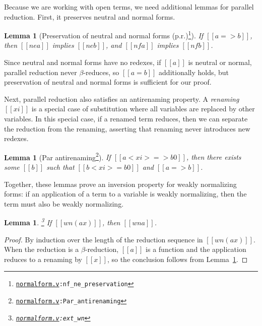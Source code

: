 \documentclass[\ifpublic nolinenum\else\fi,online,OA]{jfp}
\newcommand{\scw}[1]{}
\newcommand{\yl}[1]{}
\newcommand{\dotv}[2]{\href{#1}{\texttt{#1}}{\texttt{:#2}}}
\newtheorem{lemma}[theorem]{Lemma}
\theoremstyle{definition}
\begin{document}
Because we are working with open terms, we need additional lemmas for parallel
reduction. First, it preserves neutral and normal forms.

\begin{lemma}[Preservation of neutral and normal forms (p.r.)\footnote{\dotv{normalform.v}{nf\_ne\_preservation}}]
  \label{lemma:parnenf}
  If $[[a => b]]$, then $[[ne a]]$ implies $[[ne b]]$,
  and $[[nf a]]$ implies $[[nf b]]$.
\end{lemma}

Since neutral and normal forms have no redexes, if $[[a]]$ is neutral or normal,
parallel reduction never $\beta$-reduces, so $[[a = b]]$ additionally holds,
but preservation of neutral and normal forms is sufficient for our proof.

Next, parallel reduction also satisfies an antirenaming property. A
\emph{renaming} $[[xi]]$ is a special case of substitution where all variables
are replaced by other variables. In this special case, if a renamed term
reduces, then we can separate the reduction from the renaming, asserting that
renaming never introduces new redexes.

\begin{lemma}[Par antirenaming\footnote{\dotv{normalform.v}{Par\_antirenaming}}]
  \label{lemma:parantirenaming}
  If $[[a < xi > => b0]]$, then there exists some $[[b]]$ such that
  $[[b < xi > = b0]]$ and $[[a => b]]$.
\end{lemma}

\scw{This lemma is only used to prove \texttt{wn\_antirenaming}, which is then
used more generally. Maybe we should replace it with  that?}
\yl{Anti-renaming is mentioned once in Section 6 when we talk about how confluence with $\eta$
depends on anti-renaming for Par. I don't think that discussion in
Section 6 is very important so I'm fine with replacing it}

Together, these lemmas prove an inversion property for weakly normalizing forms:
if an application of a term to a variable is weakly normalizing, then the term
must also be weakly normalizing.

\begin{lemma}\hspace{-0.5em}\footnote{\dotv{normalform.v}{ext\_wn}}
  \label{lemma:extwn}
  If $[[wn (a x)]]$, then $[[wn a]]$.
\end{lemma}
\begin{proof}
  By induction over the length of the reduction sequence in $[[wn (a x)]]$.
  When the reduction is a $\beta$-reduction, $[[a]]$ is a function and the
  application reduces to a renaming by $[[x]]$, so the conclusion follows
  from Lemma~\ref{lemma:parantirenaming}.
\end{proof}
\end{document}
